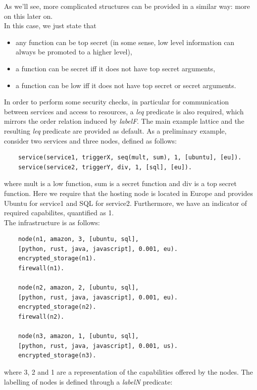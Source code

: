 \documentclass[../DraftNotes.tex]{subfiles}
\begin{document}
As we'll see, more complicated structures can be provided in a similar way: more on this later on. \\
In this case, we just state that
\begin{itemize}
	\item any function can be top secret (in some sense, low level information can always be promoted to a higher level),
	\item a function can be secret iff it does not have top secret arguments,
	\item a function can be low iff it does not have top secret or secret arguments.
\end{itemize}

In order to perform some security checks, in particular for communication between services and access to resources, a \emph{leq} predicate is also required, which mirrors the order relation induced by \emph{labelF}. The main example lattice and the resulting \emph{leq} predicate are provided as default.
\smallskip
As a preliminary example, consider two services and three nodes, defined as follows:

\begin{verbatim}
	service(service1, triggerX, seq(mult, sum), 1, [ubuntu], [eu]).
	service(service2, triggerY, div, 1, [sql], [eu]).
\end{verbatim}

where mult is a low function, sum is a secret function and div is a top secret function.
Here we require that the hosting node is located in Europe and provides Ubuntu for service1 and SQL for service2. Furthermore, we have an indicator of required capabilites, quantified as 1. \\
The infrastructure is as follows:

\begin{verbatim}
	node(n1, amazon, 3, [ubuntu, sql], 
	[python, rust, java, javascript], 0.001, eu).
	encrypted_storage(n1).
	firewall(n1).

	node(n2, amazon, 2, [ubuntu, sql], 
	[python, rust, java, javascript], 0.001, eu).
	encrypted_storage(n2).
	firewall(n2).

	node(n3, amazon, 1, [ubuntu, sql], 
	[python, rust, java, javascript], 0.001, us).
	encrypted_storage(n3).
\end{verbatim}

where 3, 2 and 1 are a representation of the capabilities offered by the nodes. The labelling of nodes is defined through a \emph{labelN} predicate: 
\end{document}
